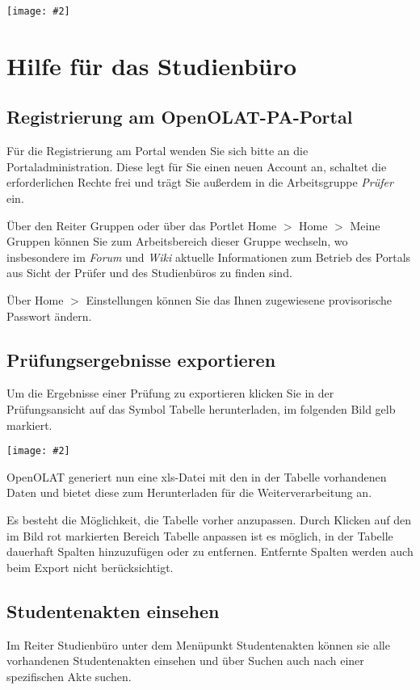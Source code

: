 \documentclass[a4paper,11pt]{article}
\newcommand{\bild}[2]{
    \begin{center}\texttt{[image: \#2]}\end{center}
}
\newcommand{\knopf}[1]{{\sc #1}}
\begin{document}
\bild{1}{ESA-Ansicht}

\clearpage
\section{Hilfe für das Studienbüro}

\subsection{Registrierung am OpenOLAT-PA-Portal}

Für die Registrierung am Portal wenden Sie sich bitte an die
Portaladministration. Diese legt für Sie einen neuen Account an, schaltet die
erforderlichen Rechte frei und trägt Sie außerdem in die Arbeitsgruppe {\em
  Prüfer} ein.

Über den Reiter \knopf{Gruppen} oder über das Portlet \knopf{Home $>$ Home $>$ Meine
  Gruppen} können Sie zum Arbeitsbereich dieser Gruppe wechseln, wo
insbesondere im {\em Forum} und {\em Wiki} aktuelle Informationen zum Betrieb
des Portals aus Sicht der Prüfer und des Studienbüros zu finden sind.

Über \knopf{Home $>$ Einstellungen} können Sie das Ihnen zugewiesene
provisorische Passwort ändern.

\subsection{Prüfungsergebnisse exportieren}

Um die Ergebnisse einer Prüfung zu exportieren klicken Sie in der
Prüfungsansicht auf das Symbol \knopf{Tabelle herunterladen}, im folgenden
Bild gelb markiert.

\bild{1}{Ergebnis-Exportieren}

OpenOLAT generiert nun eine xls-Datei mit den in der Tabelle vorhandenen Daten und
bietet diese zum Herunterladen für die Weiterverarbeitung an.

Es besteht die Möglichkeit, die Tabelle vorher anzupassen. Durch Klicken auf
den im Bild rot markierten Bereich \knopf{Tabelle anpassen} ist es möglich, in
der Tabelle dauerhaft Spalten hinzuzufügen oder zu entfernen. Entfernte Spalten werden
auch beim Export nicht berücksichtigt.

\subsection{Studentenakten einsehen}

Im Reiter \knopf{Studienbüro} unter dem Menüpunkt \knopf{Studentenakten}
können sie alle vorhandenen Studentenakten einsehen und über
\knopf{Suchen} auch nach einer spezifischen Akte suchen.
\end{document}
